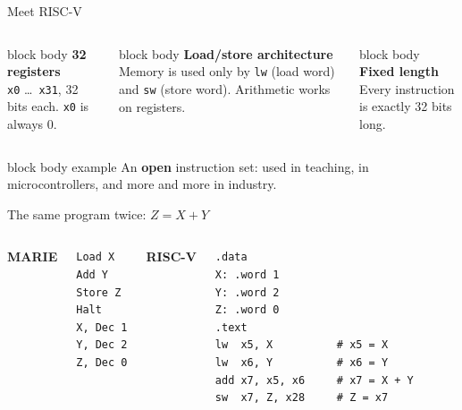 \documentclass[aspectratio=169,10pt]{beamer}
\newcommand{\stepbox}[2]{%
  \begin{beamercolorbox}[rounded=true,sep=0.09cm,wd=\linewidth]{block body}
    \footnotesize\textbf{#1}\\ #2
  \end{beamercolorbox}\vspace{0.06cm}}
\newcommand{\keymsg}[1]{%
  \begin{beamercolorbox}[rounded=true,sep=0.1cm,wd=\textwidth]{block body example}
    \centering\footnotesize #1
  \end{beamercolorbox}}
\begin{document}
\begin{frame}{Meet RISC-V}
  \begin{columns}[c,onlytextwidth]
      \centering
      \stepbox{32 registers}{\texttt{x0} \dots\ \texttt{x31}, 32 bits each. \texttt{x0} is always 0.}
      \stepbox{Load/store architecture}{Memory is used only by \texttt{lw} (load word) and \texttt{sw} (store word).
        Arithmetic works on registers.}
      \stepbox{Fixed length}{Every instruction is exactly 32 bits long.}
  \end{columns}
  \vfill
  \keymsg{An \textbf{open} instruction set: used in teaching, in microcontrollers, and more and more in industry.}
\end{frame}

\begin{frame}[fragile]{The same program twice: $Z = X + Y$}
  \begin{columns}[T,onlytextwidth]
      \centering\footnotesize\textbf{MARIE}\\[0.05cm]
\begin{lstlisting}[style=marie, numbers=none]
Load X
Add Y
Store Z
Halt
X, Dec 1
Y, Dec 2
Z, Dec 0
\end{lstlisting}
      \centering\footnotesize\textbf{RISC-V}\\[0.05cm]
\begin{lstlisting}[style=rv]
.data
X: .word 1
Y: .word 2
Z: .word 0
.text
lw  x5, X          # x5 = X
lw  x6, Y          # x6 = Y
add x7, x5, x6     # x7 = X + Y
sw  x7, Z, x28     # Z = x7
\end{lstlisting}
  \end{columns}
\end{frame}
\end{document}
